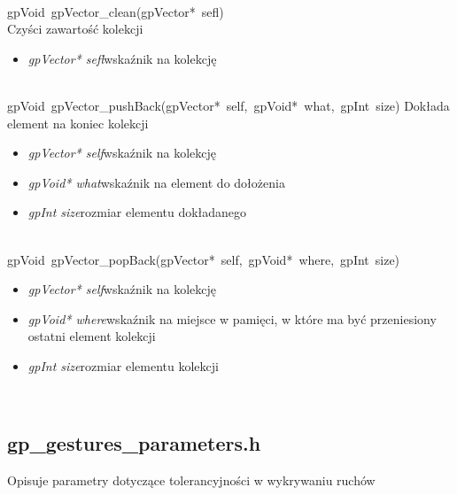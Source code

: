  \ \\
\mbox{\textsf{gpVoid gpVector_clean(gpVector* sefl)}} \\ \indent Czyści zawartość kolekcji
	\begin{itemize}
		\item \textit{gpVector* sefl}\quad wskaźnik na kolekcję
	\end{itemize}

 \ \\
\mbox{\textsf{gpVoid gpVector_pushBack(gpVector* self, gpVoid* what, gpInt size)}} Dokłada element na koniec kolekcji
	\begin{itemize}
		\item \textit{gpVector* self}\quad wskaźnik na kolekcję
		\item \textit{gpVoid* what}\quad wskaźnik na element do dołożenia
		\item \textit{gpInt size}\quad rozmiar elementu dokładanego
	\end{itemize}

 \ \\
\mbox{\textsf{gpVoid gpVector_popBack(gpVector* self, gpVoid* where, gpInt size)}}
	\begin{itemize}
		\item \textit{gpVector* self}\quad wskaźnik na kolekcję
		\item \textit{gpVoid* where}\quad wskaźnik na miejsce w pamięci, w które ma być przeniesiony ostatni element kolekcji
		\item \textit{gpInt size}\quad rozmiar elementu kolekcji
	\end{itemize}

 \ \\

\subsection{gp_gestures_parameters.h}
Opisuje parametry dotyczące tolerancyjności w wykrywaniu ruchów
